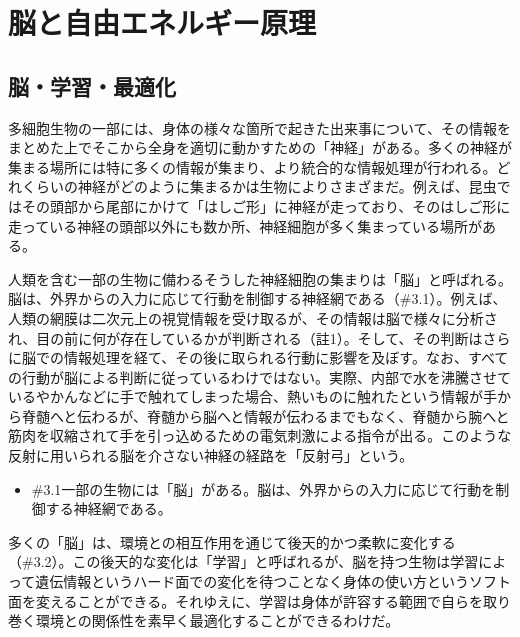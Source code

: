\section{脳と自由エネルギー原理}\label{ux8133ux3068ux81eaux7531ux30a8ux30cdux30ebux30aeux30fcux539fux7406}

\subsection{脳・学習・最適化}\label{ux8133ux5b66ux7fd2ux6700ux9069ux5316}

多細胞生物の一部には、身体の様々な箇所で起きた出来事について、その情報をまとめた上でそこから全身を適切に動かすための「神経」がある。多くの神経が集まる場所には特に多くの情報が集まり、より統合的な情報処理が行われる。どれくらいの神経がどのように集まるかは生物によりさまざまだ。例えば、昆虫ではその頭部から尾部にかけて「はしご形」に神経が走っており、そのはしご形に走っている神経の頭部以外にも数か所、神経細胞が多く集まっている場所がある。

人類を含む一部の生物に備わるそうした神経細胞の集まりは「脳」と呼ばれる。脳は、外界からの入力に応じて行動を制御する神経網である（\#3.1）。例えば、人類の網膜は二次元上の視覚情報を受け取るが、その情報は脳で様々に分析され、目の前に何が存在しているかが判断される（註1）。そして、その判断はさらに脳での情報処理を経て、その後に取られる行動に影響を及ぼす。なお、すべての行動が脳による判断に従っているわけではない。実際、内部で水を沸騰させているやかんなどに手で触れてしまった場合、熱いものに触れたという情報が手から脊髄へと伝わるが、脊髄から脳へと情報が伝わるまでもなく、脊髄から腕へと筋肉を収縮されて手を引っ込めるための電気刺激による指令が出る。このような反射に用いられる脳を介さない神経の経路を「反射弓」という。

\begin{note}{}
  \begin{itemize}
    \tightlist
    \item{\#3.1}一部の生物には「脳」がある。脳は、外界からの入力に応じて行動を制御する神経網である。
  \end{itemize}
\end{note}

多くの「脳」は、環境との相互作用を通じて後天的かつ柔軟に変化する（\#3.2）。この後天的な変化は「学習」と呼ばれるが、脳を持つ生物は学習によって遺伝情報というハード面での変化を待つことなく身体の使い方というソフト面を変えることができる。それゆえに、学習は身体が許容する範囲で自らを取り巻く環境との関係性を素早く最適化することができるわけだ。

